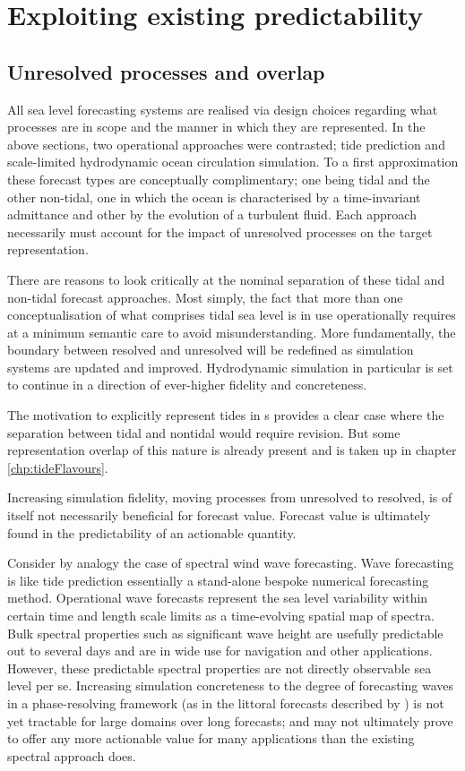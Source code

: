 \section{Exploiting existing predictability}
\label{sec:exploitingPredictability}
\subsection{Unresolved processes and overlap}
All sea level forecasting systems are realised via design choices regarding what processes are in scope and the manner in which they are represented.
In the above sections, two operational approaches were contrasted; tide prediction and scale-limited hydrodynamic ocean circulation simulation.
To a first approximation these forecast types are conceptually complimentary; one being tidal and the other non-tidal, one in which the ocean is characterised by a time-invariant admittance and other by the evolution of a turbulent fluid. 
Each approach necessarily must account for the impact of unresolved processes on the target representation.


There are reasons to look critically at the nominal separation of these tidal and non-tidal forecast approaches.
Most simply, the fact that more than one conceptualisation of what comprises tidal sea level is in use operationally requires at a minimum semantic care to avoid misunderstanding.
More fundamentally, the boundary between resolved and unresolved will be redefined as simulation systems are updated and improved.  Hydrodynamic simulation in particular is set to continue in a direction of ever-higher fidelity and concreteness.

The motivation to explicitly represent tides in \OGCM{}s provides a clear case where the separation between tidal and nontidal would require revision.   
But some representation overlap of this nature is already present and is taken up in chapter \ref{chp:tideFlavours}.


Increasing simulation fidelity, moving processes from unresolved to resolved, is of itself not necessarily beneficial for forecast value.
Forecast value is ultimately found in the predictability of an actionable quantity.  


Consider by analogy the case of spectral wind wave forecasting. 
Wave forecasting is like tide prediction essentially a stand-alone bespoke numerical forecasting method.   Operational wave forecasts represent the sea level variability within certain time and length scale limits as a time-evolving spatial map of spectra. Bulk spectral properties such as significant wave height are usefully predictable out to several days and are in wide use for navigation and other applications.   However, these predictable spectral properties are not directly observable sea level per se.   Increasing simulation concreteness to the degree of forecasting waves in a phase-resolving framework (as in the littoral forecasts described by \citep{10.1080/1755876x.2019.1685834}) is not yet tractable for large domains over long forecasts; and may not ultimately prove to offer any more actionable value for many applications than the existing spectral approach does.



